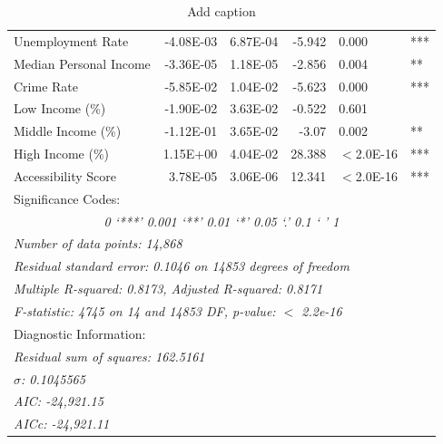 \begin{table}[!ht]
\begin{tabular}{llllll}
    Unemployment Rate & \multicolumn{1}{r}{-4.08E-03} & \multicolumn{1}{r}{6.87E-04} & \multicolumn{1}{r}{-5.942} & 0.000 & *** \\
    Median Personal Income & \multicolumn{1}{r}{-3.36E-05} & \multicolumn{1}{r}{1.18E-05} & \multicolumn{1}{r}{-2.856} & 0.004 & ** \\
    Crime Rate & \multicolumn{1}{r}{-5.85E-02} & \multicolumn{1}{r}{1.04E-02} & \multicolumn{1}{r}{-5.623} & 0.000 & *** \\
    Low Income (\%) & \multicolumn{1}{r}{-1.90E-02} & \multicolumn{1}{r}{3.63E-02} & \multicolumn{1}{r}{-0.522} & 0.601 &  \\
    Middle Income (\%) & \multicolumn{1}{r}{-1.12E-01} & \multicolumn{1}{r}{3.65E-02} & \multicolumn{1}{r}{-3.07} & 0.002 & ** \\
    High Income (\%) & \multicolumn{1}{r}{1.15E+00} & \multicolumn{1}{r}{4.04E-02} & \multicolumn{1}{r}{28.388} & $<$2.0E-16 & *** \\
    Accessibility Score & \multicolumn{1}{r}{3.78E-05} & \multicolumn{1}{r}{3.06E-06} & \multicolumn{1}{r}{12.341} & $<$2.0E-16 & *** \\
    \midrule
    \multicolumn{6}{l}{Significance Codes:} \\
    \multicolumn{6}{c}{\textit{0 ‘***’ 0.001 ‘**’ 0.01 ‘*’ 0.05 ‘.’ 0.1 ‘ ’ 1}} \\
    \multicolumn{6}{l}{\textit{Number of data points: 14,868}} \\
    \multicolumn{6}{l}{\textit{Residual standard error: 0.1046 on 14853 degrees of freedom}} \\
    \multicolumn{6}{l}{\textit{Multiple R-squared:  0.8173, 	Adjusted R-squared:  0.8171 }} \\
    \multicolumn{6}{l}{\textit{F-statistic:  4745 on 14 and 14853 DF,  p-value: $<$ 2.2e-16}} \\
    \multicolumn{6}{l}{Diagnostic Information:} \\
    \multicolumn{6}{l}{\textit{Residual sum of squares: 162.5161}} \\
    \multicolumn{6}{l}{\textit{$\hat{\sigma}$: 0.1045565}} \\
    \multicolumn{6}{l}{\textit{AIC:  -24,921.15}} \\
    \multicolumn{6}{l}{\textit{AICc:  -24,921.11}} \\
    \end{tabular}%
    \caption{Add caption}
  \label{tab:addlabel}%
\end{table}%


